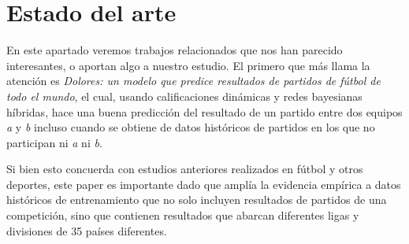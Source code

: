 \chapter{Estado del arte}

En este apartado veremos trabajos relacionados que 
nos han parecido interesantes, o aportan algo a 
nuestro estudio. El primero que más llama la atención es 
\textit{Dolores: un modelo que predice resultados de
partidos de fútbol de todo el mundo}\cite{dolores}, el 
cual, usando calificaciones dinámicas y redes bayesianas
híbridas, hace una buena predicción del resultado de un partido 
entre dos equipos \textit{a} y \textit{b} incluso cuando 
se obtiene de datos históricos de partidos 
en los que no participan ni \textit{a} ni \textit{b}.

Si bien esto concuerda con estudios anteriores realizados 
en fútbol y otros deportes, este paper es importante dado que 
amplía la evidencia empírica a datos históricos de entrenamiento 
que no solo incluyen resultados de partidos de una competición, 
sino que contienen resultados que abarcan diferentes ligas y 
divisiones de 35 países diferentes.